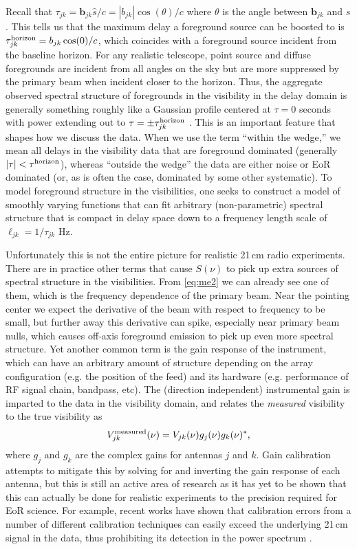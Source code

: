 \documentclass[a4paper,fleqn,usenatbib]{mnras}
\begin{document}
Recall that $\tau_{jk} = \boldsymbol{b}_{jk}\hat{s}/c = |b_{jk}|\cos(\theta)/c$ where $\theta$ is the angle between $\boldsymbol{b}_{jk}$ and $\hat{s}$.
This tells us that the maximum delay a foreground source can be boosted to is $\tau_{jk}^{\rm horizon} = b_{jk}\cos(0)/c$, which coincides with a foreground source incident from the baseline horizon.
For any realistic telescope, point source and diffuse foregrounds are incident from all angles on the sky but are more suppressed by the primary beam when incident closer to the horizon.
Thus, the aggregate observed spectral structure of foregrounds in the visibility in the delay domain is generally something roughly like a Gaussian profile centered at $\tau=0$ seconds with power extending out to $\tau=\pm\tau_{jk}^{\rm horizon}$ \citep{Parsons2012b}.
This is an important feature that shapes how we discuss the data.
When we use the term ``within the wedge,'' we mean all delays in the visibility data that are foreground dominated (generally $|\tau| < \tau^{\rm horizon}$), whereas ``outside the wedge'' the data are either noise or EoR dominated (or, as is often the case, dominated by some other systematic).
To model foreground structure in the visibilities, one seeks to construct a model of smoothly varying functions that can fit arbitrary (non-parametric) spectral structure that is compact in delay space down to a frequency length scale of $\ell_{jk} = 1/\tau_{jk}$ Hz.

Unfortunately this is not the entire picture for realistic 21\,cm radio experiments.
There are in practice other terms that cause $S(\nu)$ to pick up extra sources of spectral structure in the visibilities.
From \autoref{eq:me2} we can already see one of them, which is the frequency dependence of the primary beam.
Near the pointing center we expect the derivative of the beam with respect to frequency to be small, but further away this derivative can spike, especially near primary beam nulls, which causes off-axis foreground emission to pick up even more spectral structure.
Yet another common term is the gain response of the instrument, which can have an arbitrary amount of structure depending on the array configuration (e.g. the position of the feed) and its hardware (e.g. performance of RF signal chain, bandpass, etc).
The (direction independent) instrumental gain is imparted to the data in the visibility domain, and relates the \emph{measured} visibility to the true visibility as
\begin{align}
V_{jk}^{\rm measured}(\nu) = V_{jk}(\nu)g_j(\nu)g_k(\nu)^\ast,
\end{align}
where $g_j$ and $g_k$ are the complex gains for antennas $j$ and $k$.
Gain calibration attempts to mitigate this by solving for and inverting the gain response of each antenna, but this is still an active area of research as it has yet to be shown that this can actually be done for realistic experiments to the precision required for EoR science.
For example, recent works have shown that calibration errors from a number of different calibration techniques can easily exceed the underlying 21\,cm signal in the data, thus prohibiting its detection in the power spectrum \citep{Barry2016, Ewall-Wice2017, Dillon2017, Orosz2018, Byrne2019, Jospeh2019, Kern2020b}.
\end{document}
